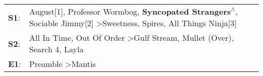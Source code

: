 \begin{supertabular}{p{0.03\textwidth}p{0.92\textwidth}}
 \textbf{S1}:  &  August[1]\textsuperscript{}, \enspace Professor Wormbog\textsuperscript{}, \enspace \textbf{Syncopated Strangers\textsuperscript{$\wedge$}}, \enspace Sociable Jimmy[2]\textsuperscript{} \textgreater \enspace Sweetness\textsuperscript{}, \enspace Spires\textsuperscript{}, \enspace All Things Ninja[3]\textsuperscript{}  \enspace  \\
 \textbf{S2}:  &                                                                                     All In Time\textsuperscript{}, \enspace Out Of Order\textsuperscript{} \textgreater \enspace Gulf Stream\textsuperscript{}, \enspace Mullet (Over)\textsuperscript{}, \enspace Search 4\textsuperscript{}, \enspace Layla\textsuperscript{}  \enspace  \\
 \textbf{E1}:  &                                                                                                                                                                                                                                                       Preamble\textsuperscript{} \textgreater \enspace Mantis\textsuperscript{}  \enspace  \\
\end{supertabular}
